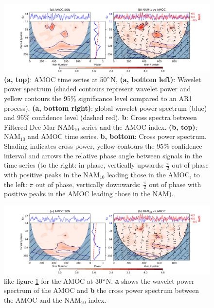 \begin{center}
\begin{figure}[h!]
\noindent\includegraphics[width = \linewidth]{Figures/Figures-surface/AMOC_NAM_filtered_subplot.png}
\caption[Wavelet power spectrum of the AMOC at 50$\degree$N and cross spectrum with the NAM$_{10}$ index]{\textbf{(a, top)}: AMOC time series at 50$\degree$N, \textbf{(a, bottom left)}: Wavelet power spectrum (shaded contours represent wavelet power and yellow contours the 95\% significance level compared to an AR1 process), \textbf{(a, bottom right)}: global wavelet power spectrum (blue) and 95\% confidence level (dashed red). \textbf{b}: Cross spectra between Filtered Dec-Mar NAM$_{10}$ series and the AMOC index. \textbf{(b, top)}: NAM$_{10}$ and AMOC time series. \textbf{b, bottom}: Cross power spectrum. Shading indicates cross power, yellow contours the 95\% confidence interval and arrows the relative phase angle between signals in the time series (to the right: in phase, vertically upwards: $\frac{\pi}{2}$ out of phase with positive peaks in the NAM$_{10}$ leading those in the AMOC, to the left: $\pi$ out of phase, vertically downwards: $\frac{\pi}{2}$ out of phase with positive peaks in the AMOC leading those in the NAM).}
\label{NAM_AMOC_Cross}
\end{figure}
\end{center}

\begin{center}
\begin{figure}[h!]
\noindent\includegraphics[width = \linewidth]{Figures/Figures-surface/AMOC_NAM_filtered_subplot_30N.png}
\caption[Wavelet power spectrum of the AMOC at 30$\degree$N and cross spectrum with the NAM$_{10}$ index]{like figure \ref{NAM_AMOC_Cross} for the AMOC at 30$\degree$N. \textbf{a} shows the wavelet power spectrum of the AMOC and \textbf{b} the cross power spectrum between the AMOC and the NAM$_{10}$ index.}
\label{NAM_AMOC_Cross_30}
\end{figure}
\end{center}

